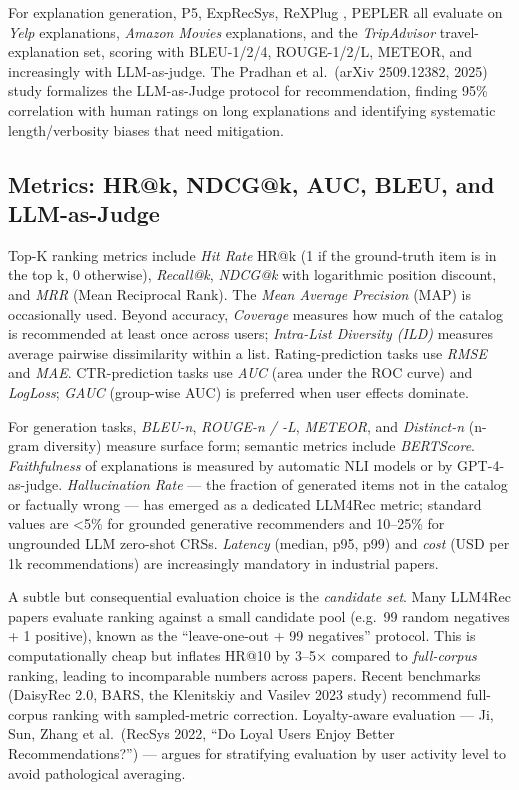 \documentclass{article}
\begin{document}
For explanation generation, P5, ExpRecSys, ReXPlug \citep{hada2021sigir2021}, PEPLER \citep{li2023textisallyouneedle} all evaluate on \emph{Yelp} explanations, \emph{Amazon Movies} explanations, and the \emph{TripAdvisor} travel-explanation set, scoring with BLEU-1/2/4, ROUGE-1/2/L, METEOR, and increasingly with LLM-as-judge. The Pradhan et al.~(arXiv 2509.12382, 2025) study formalizes the LLM-as-Judge protocol for recommendation, finding 95\% correlation with human ratings on long explanations and identifying systematic length/verbosity biases that need mitigation.

\subsection{Metrics: HR@k, NDCG@k, AUC, BLEU, and LLM-as-Judge}\label{metrics-hrk-ndcgk-auc-bleu-and-llm-as-judge}

Top-K ranking metrics include \emph{Hit Rate} HR@k (1 if the ground-truth item is in the top k, 0 otherwise), \emph{Recall@k}, \emph{NDCG@k} with logarithmic position discount, and \emph{MRR} (Mean Reciprocal Rank). The \emph{Mean Average Precision} (MAP) is occasionally used. Beyond accuracy, \emph{Coverage} measures how much of the catalog is recommended at least once across users; \emph{Intra-List Diversity (ILD)} measures average pairwise dissimilarity within a list. Rating-prediction tasks use \emph{RMSE} and \emph{MAE}. CTR-prediction tasks use \emph{AUC} (area under the ROC curve) and \emph{LogLoss}; \emph{GAUC} (group-wise AUC) is preferred when user effects dominate.

For generation tasks, \emph{BLEU-n}, \emph{ROUGE-n / -L}, \emph{METEOR}, and \emph{Distinct-n} (n-gram diversity) measure surface form; semantic metrics include \emph{BERTScore}. \emph{Faithfulness} of explanations is measured by automatic NLI models or by GPT-4-as-judge. \emph{Hallucination Rate} --- the fraction of generated items not in the catalog or factually wrong --- has emerged as a dedicated LLM4Rec metric; standard values are \textless5\% for grounded generative recommenders and 10--25\% for ungrounded LLM zero-shot CRSs. \emph{Latency} (median, p95, p99) and \emph{cost} (USD per 1k recommendations) are increasingly mandatory in industrial papers.

A subtle but consequential evaluation choice is the \emph{candidate set}. Many LLM4Rec papers evaluate ranking against a small candidate pool (e.g.~99 random negatives + 1 positive), known as the ``leave-one-out + 99 negatives'' protocol. This is computationally cheap but inflates HR@10 by 3--5× compared to \emph{full-corpus} ranking, leading to incomparable numbers across papers. Recent benchmarks (DaisyRec 2.0, BARS, the Klenitskiy and Vasilev 2023 study) recommend full-corpus ranking with sampled-metric correction. Loyalty-aware evaluation --- Ji, Sun, Zhang et al.~(RecSys 2022, ``Do Loyal Users Enjoy Better Recommendations?'') --- argues for stratifying evaluation by user activity level to avoid pathological averaging.
\end{document}
